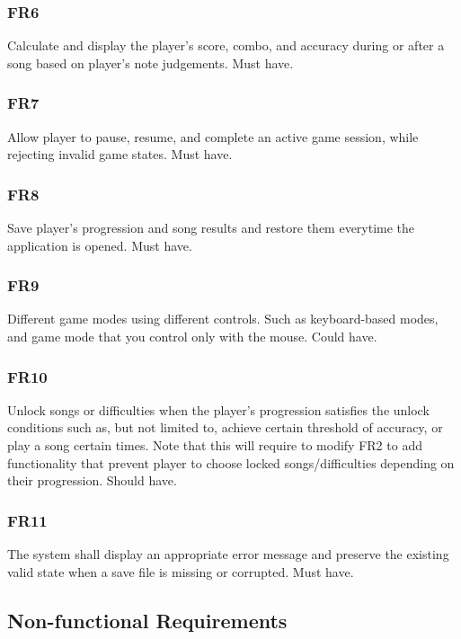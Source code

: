 \documentclass[12pt,a4paper]{article}
\begin{document}
        \subsubsection{FR6}
            Calculate and display the player's score, combo, and accuracy during or after a song based on player's note judgements. Must have.

        \subsubsection{FR7}
            Allow player to pause, resume, and complete an active game session, while rejecting invalid game states. Must have.

        \subsubsection{FR8}
            Save player's progression and song results and restore them everytime the application is opened. Must have.
        
        \subsubsection{FR9}
            Different game modes using different controls. Such as keyboard-based modes, and game mode that you control only with the mouse. Could have.
        
        \subsubsection{FR10}
            Unlock songs or difficulties when the player's progression satisfies the unlock conditions such as, but not limited to, achieve certain threshold of accuracy, or play a song certain times. 
            Note that this will require to modify FR2 to add functionality that prevent player to choose locked songs/difficulties depending on their progression. Should have.

        \subsubsection{FR11}
            The system shall display an appropriate error message and preserve the existing valid state when a save file is missing or corrupted. Must have.

\pagebreak

    \subsection{Non-functional Requirements}
\end{document}
